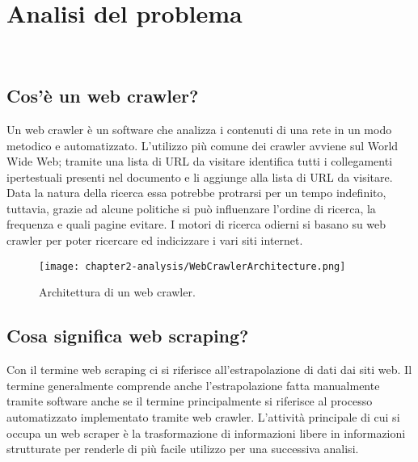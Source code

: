 
\chapter{Analisi del problema}
\label{cap:analisi-del-problema}

\\

\section{Cos'è un web crawler?}

Un web crawler è un software che analizza i contenuti di una rete in un modo metodico e automatizzato. L'utilizzo più comune dei crawler avviene sul World Wide Web; tramite una lista di URL da visitare identifica tutti i collegamenti ipertestuali presenti nel documento e li aggiunge alla lista di URL da visitare. Data la natura della ricerca essa potrebbe protrarsi per un tempo indefinito, tuttavia, grazie ad alcune politiche si può influenzare l'ordine di ricerca, la frequenza e quali pagine evitare. I motori di ricerca odierni si basano su web crawler per poter ricercare ed indicizzare i vari siti internet.

\begin{figure}[!h] 
    \centering 
    \texttt{[image: chapter2-analysis/WebCrawlerArchitecture.png]} 
    \caption{Architettura di un web crawler.}
\end{figure}

\section{Cosa significa web scraping?}

Con il termine web scraping ci si riferisce all'estrapolazione di dati dai siti web. Il termine generalmente comprende anche l'estrapolazione fatta manualmente tramite software anche se il termine principalmente si riferisce al processo automatizzato implementato tramite web crawler. L'attività principale di cui si occupa un web scraper è la trasformazione di informazioni libere in informazioni strutturate per renderle di più facile utilizzo per una successiva analisi. 

